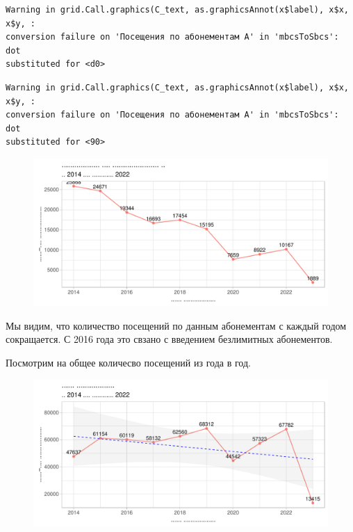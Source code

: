 \documentclass[
  letterpaper,
  DIV=11,
  numbers=noendperiod]{scrartcl}
\begin{document}
\begin{verbatim}
Warning in grid.Call.graphics(C_text, as.graphicsAnnot(x$label), x$x, x$y, :
conversion failure on 'Посещения по абонементам А' in 'mbcsToSbcs': dot
substituted for <d0>
\end{verbatim}

\begin{verbatim}
Warning in grid.Call.graphics(C_text, as.graphicsAnnot(x$label), x$x, x$y, :
conversion failure on 'Посещения по абонементам А' in 'mbcsToSbcs': dot
substituted for <90>
\end{verbatim}

\begin{figure}

{\centering \includegraphics{./intro_files/figure-pdf/unnamed-chunk-10-1.pdf}

}

\end{figure}

Мы видим, что количество посещений по данным абонементам с каждый годом
сокращается. С 2016 года это свзано с введением безлимитных абонементов.

Посмотрим на общее количесво посещений из года в год.

\begin{figure}

{\centering \includegraphics{./intro_files/figure-pdf/unnamed-chunk-11-1.pdf}

}

\end{figure}
\end{document}
